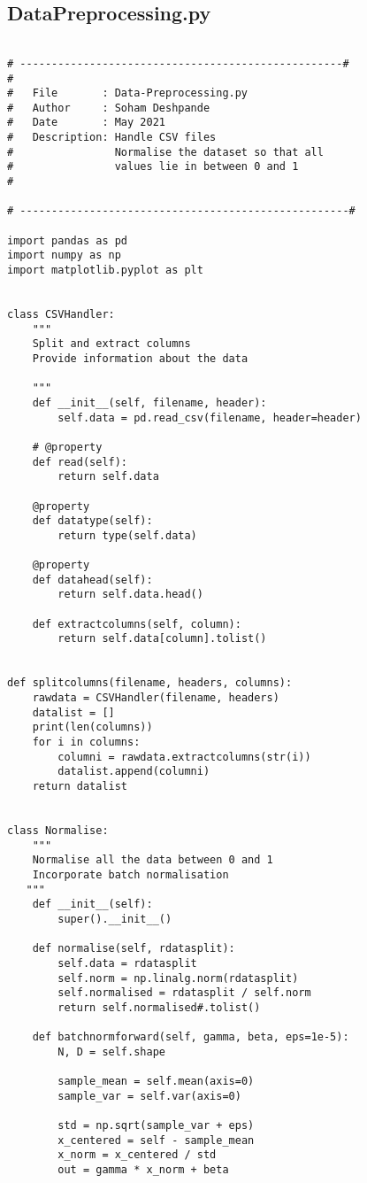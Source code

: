 \documentclass{article}
\begin{document}
\subsection{DataPreprocessing.py}
\begin{lstlisting}

# ---------------------------------------------------#
#
#   File       : Data-Preprocessing.py
#   Author     : Soham Deshpande
#   Date       : May 2021
#   Description: Handle CSV files
#                Normalise the dataset so that all
#                values lie in between 0 and 1
#

# ----------------------------------------------------#

import pandas as pd
import numpy as np
import matplotlib.pyplot as plt


class CSVHandler:
    """
    Split and extract columns
    Provide information about the data

    """
    def __init__(self, filename, header):
        self.data = pd.read_csv(filename, header=header)

    # @property
    def read(self):
        return self.data

    @property
    def datatype(self):
        return type(self.data)

    @property
    def datahead(self):
        return self.data.head()

    def extractcolumns(self, column):
        return self.data[column].tolist()


def splitcolumns(filename, headers, columns):
    rawdata = CSVHandler(filename, headers)
    datalist = []
    print(len(columns))
    for i in columns:
        columni = rawdata.extractcolumns(str(i))
        datalist.append(columni)
    return datalist


class Normalise:
    """
    Normalise all the data between 0 and 1
    Incorporate batch normalisation
   """
    def __init__(self):
        super().__init__()

    def normalise(self, rdatasplit):
        self.data = rdatasplit
        self.norm = np.linalg.norm(rdatasplit)
        self.normalised = rdatasplit / self.norm
        return self.normalised#.tolist()

    def batchnormforward(self, gamma, beta, eps=1e-5):
        N, D = self.shape

        sample_mean = self.mean(axis=0)
        sample_var = self.var(axis=0)

        std = np.sqrt(sample_var + eps)
        x_centered = self - sample_mean
        x_norm = x_centered / std
        out = gamma * x_norm + beta


\end{lstlisting}
\end{document}
